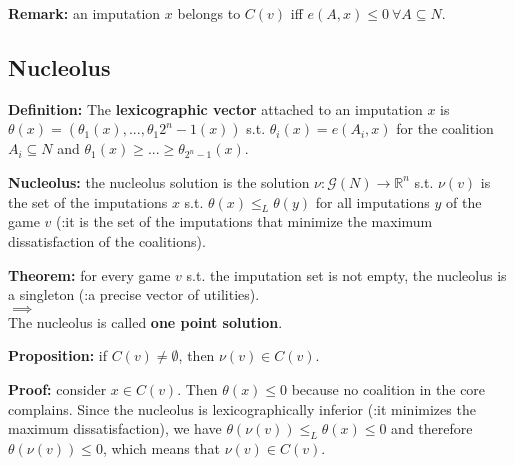 \bigskip
\noindent \textbf{Remark:} an imputation $x$ belongs to $C(v)$ iff $e(A,x) \leq 0 ~\forall A \subseteq N$.

\subsection{Nucleolus}

\noindent \textbf{Definition:} The \textbf{lexicographic vector} attached to an imputation $x$ is $\theta(x) = (\theta_1(x),...,\theta_1{2^n-1}(x))$ s.t. $\theta_i(x) = e(A_i,x)$ for the coalition $A_i \subseteq N$ and $\theta_1(x) \geq ... \geq \theta_{2^n-1}(x)$.

\bigskip
\noindent \textbf{Nucleolus:} the nucleolus solution is the solution $\nu: \mathcal{G}(N) \rightarrow \mathbb{R}^n$ s.t. $\nu(v)$ is the set of the imputations $x$ s.t. $\theta(x) \leq_L \theta(y)$ for all imputations $y$ of the game $v$ (:it is the set of the imputations that minimize the maximum dissatisfaction of the coalitions).

\bigskip
\noindent \textbf{Theorem:} for every game $v$ s.t. the imputation set is not empty, the nucleolus is a singleton (:a precise vector of utilities).\\
$\implies$\\
The nucleolus is called \textbf{one point solution}.

\bigskip
\noindent \textbf{Proposition:} if $C(v) \neq \emptyset$, then $\nu(v) \in C(v)$.

\bigskip
\noindent \textbf{Proof:} consider $x \in C(v)$. Then $\theta(x) \leq 0$ because no coalition in the core complains. Since the nucleolus is lexicographically inferior (:it minimizes the maximum dissatisfaction), we have $\theta(\nu(v)) \leq_L \theta(x) \leq 0$ and therefore $\theta(\nu(v)) \leq 0$, which means that $\nu(v) \in C(v)$.

%
